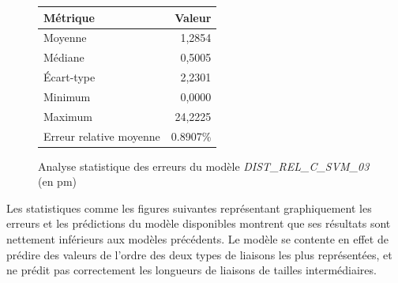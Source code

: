 \begin{figure}[!h]
	\centering
	\begin{tabular}{|l|r|}
		\hline
		\textbf{Métrique} & \textbf{Valeur} \\ \hline
		Moyenne & 1,2854 \\ \hline
		Médiane & 0,5005 \\ \hline
		Écart-type & 2,2301 \\ \hline
		Minimum & 0,0000 \\ \hline
		Maximum & 24,2225\\ \hline
		Erreur relative moyenne & 0.8907\% \\ \hline
	\end{tabular}
	
	\caption{Analyse statistique des erreurs du modèle \emph{DIST\_REL\_C\_SVM\_03} (en pm)}
\end{figure}

\par Les statistiques comme les figures suivantes représentant graphiquement les erreurs et les prédictions du modèle disponibles montrent que ses résultats sont nettement inférieurs aux modèles précédents. Le modèle se contente en effet de prédire des valeurs de l'ordre des deux types de liaisons les plus représentées, et ne prédit pas correctement les longueurs de liaisons de tailles intermédiaires.\\


